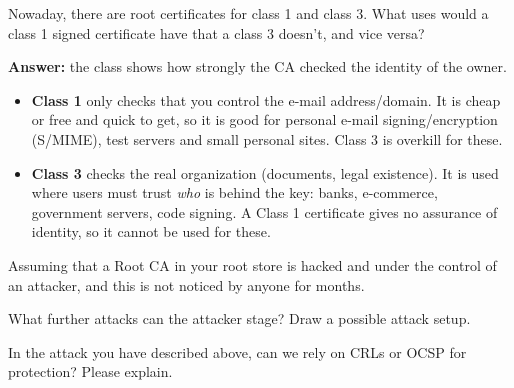 \documentclass[a4paper, 10pt]{article}
\begin{document}

\begin{problem}
	Nowaday, there are root certificates for class 1 and class 3.
	What uses would a class 1 signed certificate have that a class 3 doesn't, and vice versa?
\end{problem}

\begin{solution}
	\noindent \textbf{Answer:} the class shows how strongly the CA checked the identity of the owner.
	\begin{itemize}
		\item \textbf{Class 1} only checks that you control the e-mail address/domain.
		      It is cheap or free and quick to get, so it is good for personal e-mail signing/encryption (S/MIME), test servers and small personal sites.
		      Class 3 is overkill for these.
		\item \textbf{Class 3} checks the real organization (documents, legal existence).
		      It is used where users must trust \emph{who} is behind the key: banks, e-commerce, government servers, code signing.
		      A Class 1 certificate gives no assurance of identity, so it cannot be used for these.
	\end{itemize}
\end{solution}

\newpage

\begin{problem}
	Assuming that a Root CA in your root store is hacked and under the control of an attacker,
	and this is not noticed by anyone for months.
	\begin{subproblems_alpha}
		\item What further attacks can the attacker stage? Draw a possible attack setup.
		\item In the attack you have described above, can we rely on CRLs or OCSP for protection? Please explain.
	\end{subproblems_alpha}
\end{problem}
\end{document}
